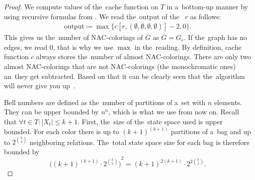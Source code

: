%
%
\begin{proof}
	We compute values of the~cache function on \( T \) in a~bottom-up manner
	by using recursive formulas from
	.
	We read the~output of the~\RootNode{} \( r \) as follows:
	\begin{align*}
		\text{output} \coloneqq \max\{c[r, (\emptyset,\emptyset,\emptyset,\emptyset)] - 2, 0\}.
	\end{align*}
	This gives us the~number of NAC-colorings of \( G \) as \( G = G_r \).
	If the~graph has no edges, we read \( 0 \), that is why we use \( \max{} \) in the~reading.
	By definition, cache function \( c \) always stores the~number of almost NAC-colorings.
	There are only two almost NAC-colorings
	that are not NAC-colorings (the monochromatic ones) an~they get subtracted.
	Based on that it can be clearly seen that the~algorithm
	will never give you up~\cite{never_gonna_give_you_up}.

	Bell numbers are defined as
	the~number of partitions of a~set with \( n \) elements.
	They can be upper bounded by \( n^n \), which is what we use from now on.
	Recall that \( \forall t \in T : |X_t| \le k+1 \).
	First, the~size of the~state space used is upper bounded.
	For each color there is up to \( {(k+1)}^{(k+1)} \) partitions of a~bag and
	up to \( 2^{\binom{k}{2}} \) neighboring relations.
	The~total state space size for each bag is therefore bounded by
	\[ {\Big({(k+1)}^{(k+1)} \cdot 2^{\binom{k}{2}} \Big)}^2 = {(k+1)}^{2(k+1)} \cdot 2^{2 \binom{k}{2}}. \]


\end{proof}
